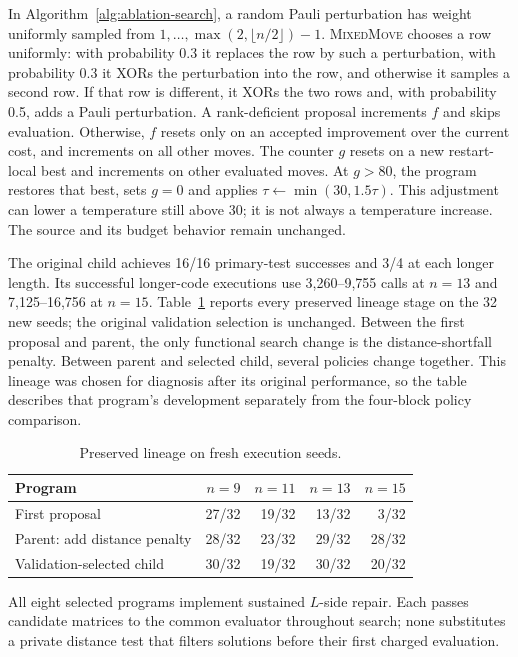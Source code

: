In Algorithm~\ref{alg:ablation-search}, a random Pauli perturbation has weight
uniformly sampled from $1,\ldots,\max(2,\lfloor n/2\rfloor)-1$.
\textsc{MixedMove} chooses a row uniformly: with probability 0.3 it
replaces the row by such a perturbation, with probability 0.3 it XORs
the perturbation into the row, and otherwise it samples a second row.
If that row is different, it XORs the two rows and, with probability
0.5, adds a Pauli perturbation. A rank-deficient proposal increments
$f$ and skips evaluation. Otherwise, $f$ resets only on an accepted
improvement over the current cost, and increments on all other moves.
The counter $g$ resets on a new restart-local best and increments on
other evaluated moves. At $g>80$, the program restores that best,
sets $g=0$ and applies $\tau\leftarrow\min(30,1.5\tau)$. This adjustment
can lower a temperature still above 30; it is not always a temperature
increase. The source and its budget behavior remain unchanged.

\newpage
The original child achieves 16/16 primary-test successes and 3/4 at
each longer length. Its successful longer-code executions use
3,260--9,755 calls at $n=13$ and 7,125--16,756 at $n=15$.
Table~\ref{tab:hitl-lineage} reports every preserved lineage stage on
the 32 new seeds; the original validation selection is unchanged.
Between the first proposal and parent, the only functional search change
is the distance-shortfall penalty. Between parent and selected child,
several policies change together. This lineage was chosen for diagnosis
after its original performance, so the table describes that program's
development separately from the four-block policy comparison.

\begin{table}[!htbp]
\centering\small
\begin{tabular}{lrrrr}
\toprule
Program & $n=9$ & $n=11$ & $n=13$ & $n=15$\\
\midrule
First proposal & 27/32 & 19/32 & 13/32 & 3/32\\
Parent: add distance penalty & 28/32 & 23/32 & 29/32 & 28/32\\
Validation-selected child & 30/32 & 19/32 & 30/32 & 20/32\\
\bottomrule
\end{tabular}
\caption{Preserved lineage on fresh execution seeds.}\label{tab:hitl-lineage}
\end{table}

All eight selected programs implement sustained $L$-side repair. Each
passes candidate matrices to the common evaluator throughout search;
none substitutes a private distance test that filters solutions before
their first charged evaluation.
